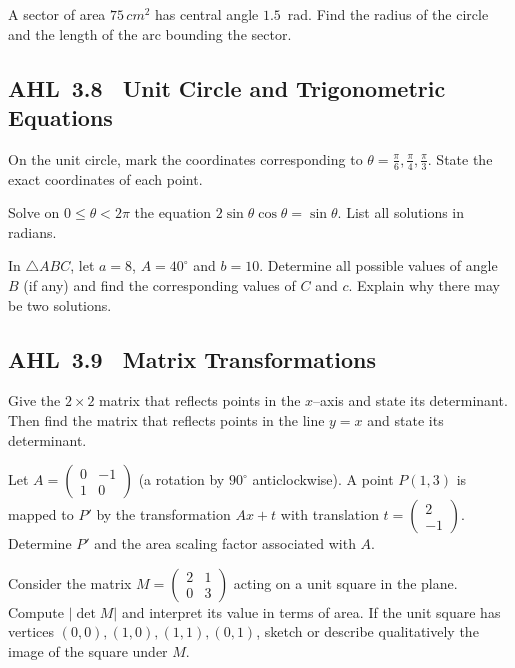 \documentclass[11pt]{article}
\def\mathbf#1{#1}%
\def\mathrm#1{#1}%
\newcommand{\tocsubsection}[1]{\subsection{#1}}
\newcounter{question}
\begin{document}
\begin{question}
A sector of area $75\,\mathrm{cm}^2$ has central angle $1.5$~rad.
Find the radius of the circle and the length of the arc bounding the sector.
\end{question}

\tocsubsection{AHL 3.8 \; Unit Circle and Trigonometric Equations}

\begin{question}
On the unit circle, mark the coordinates corresponding to
\(\theta=\tfrac{\pi}{6},\tfrac{\pi}{4},\tfrac{\pi}{3}\).  State the exact
coordinates of each point.
\end{question}

\begin{question}
Solve on $0\le\theta<2\pi$ the equation $2\sin\theta\cos\theta=\sin\theta$.  List
all solutions in radians.
\end{question}

\begin{question}
In $\triangle ABC$, let $a=8$, $A=40^{\circ}$ and $b=10$.  Determine all
possible values of angle~$B$ (if any) and find the corresponding values of
$C$ and $c$.  Explain why there may be two solutions.
\end{question}

\tocsubsection{AHL 3.9 \; Matrix Transformations}

\begin{question}
Give the $2\times2$ matrix that reflects points in the $x$–axis and state its
determinant.  Then find the matrix that reflects points in the line $y=x$ and
state its determinant.
\end{question}

\begin{question}
Let $A=\begin{pmatrix}0 & -1 \\ 1 & 0\end{pmatrix}$ (a rotation by
$90^{\circ}$ anticlockwise).  A point $P(1,3)$ is mapped to $P'$ by the
transformation $A\mathbf{x}+\mathbf{t}$ with translation
$\mathbf{t}=\begin{pmatrix}2 \\ -1\end{pmatrix}$.  Determine $P'$ and the
area scaling factor associated with $A$.
\end{question}

\begin{question}
Consider the matrix $M=\begin{pmatrix}2 & 1 \\ 0 & 3\end{pmatrix}$ acting on
a unit square in the plane.  Compute $|\det M|$ and interpret its value in
terms of area.  If the unit square has vertices $(0,0),(1,0),(1,1),(0,1)$,
sketch or describe qualitatively the image of the square under $M$.
\end{question}
\end{document}
